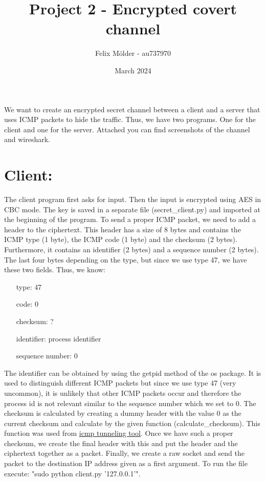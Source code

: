 \documentclass{article}
\title{Project 2 - Encrypted covert channel}
\author{Felix Mölder - au737970}
\date{March 2024}
\begin{document}
\maketitle
We want to create an encrypted secret channel between a client and a server that uses ICMP packets to hide the traffic. Thus, we have two programs. One for the client and one for the server. Attached you can find screenshots of the channel and wireshark.

\section*{Client:}

The client program first asks for input. Then the input is encrypted using AES in CBC mode. The key is saved in a separate file (secret\_client.py) and imported at the beginning of the program. To send a proper ICMP packet, we need to add a header to the ciphertext. This header has a size of 8 bytes and contains the ICMP type (1 byte), the ICMP code (1 byte) and the checksum (2 bytes). Furthermore, it contains an identifier (2 bytes) and a sequence number (2 bytes). The last four bytes depending on the type, but since we use type 47, we have these two fields. Thus, we know:
\begin{itemize}
    \item[type:] 47
    \item[code:] 0
    \item[checksum:] ?
    \item[identifier:] process identifier
    \item[sequence number:] 0      
\end{itemize}
The identifier can be obtained by using the getpid method of the os package. It is used to distinguish different ICMP packets but since we use type 47 (very uncommon), it is unlikely that other ICMP packets occur and therefore the process id is not relevant similar to the sequence number which we set to 0. The checksum is calculated by creating a dummy header with the value 0 as the current checksum and calculate by the given function (calculate\_checksum). This function was used from \href{https://github.com/00dhkim/icmp-tunneling-tool/blob/master/pyping/core.py}{icmp tunneling tool}. Once we have such a proper checksum, we create the final header with this and put the header and the ciphertext together as a packet. Finally, we create a raw socket and send the packet to the destination IP address given as a first argument. To run the file execute: "sudo python client.py '127.0.0.1'". 
\end{document}
